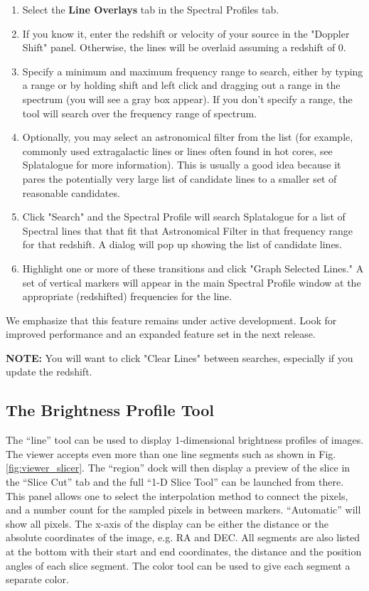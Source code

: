 \begin{enumerate}
\item Select the {\bf Line Overlays} tab in the Spectral Profiles tab.
\item If you know it, enter the redshift or velocity of your source in the "Doppler Shift" panel. Otherwise, the lines will be
overlaid assuming a redshift of 0.
\item Specify a minimum and maximum frequency range to search, either by typing a range or by holding 
shift and left click and dragging out a range in the spectrum (you will see a gray box appear). If you don't specify a range,
the tool will search over the frequency range of spectrum.
\item Optionally, you may select an astronomical filter from the list (for example, commonly used extragalactic lines or lines
often found in hot cores, see Splatalogue for more information). This is 
usually a good idea because it pares the potentially very large list of  candidate lines to a smaller set of reasonable candidates. 
\item Click "Search" and the Spectral Profile will search Splatalogue for a list of Spectral lines that that fit that Astronomical
Filter in that frequency range for that redshift. A dialog will pop up showing the list of candidate lines. 
\item Highlight one or more of these transitions and click "Graph Selected Lines." A set of vertical markers will 
appear in the main Spectral Profile window at the appropriate (redshifted) frequencies for the line.
\end{enumerate}

We emphasize that this feature remains under active development. Look for improved performance and an expanded feature set in the next release.

{\bf NOTE:} You will want to click "Clear Lines" between searches, especially if you update the redshift.


\subsection{The Brightness Profile Tool}
\label{section:display.image.bprofile}

The ``line'' tool can be used to display 1-dimensional brightness
profiles of images. The viewer accepts even more than one line
segments such as shown in Fig.\ref{fig:viewer_slicer}. The ``region''
dock will then display a preview of the slice in the ``Slice Cut'' tab
and the full ``1-D Slice Tool'' can be launched from there. This panel
allows one to select the interpolation method to connect the pixels,
and a number count for the sampled pixels in between
markers. ``Automatic'' will show all pixels. The x-axis of the display can
be either the distance or the absolute coordinates of the image,
e.g. RA and DEC. All segments are also listed at the bottom with their
start and end coordinates, the distance and the position angles of each
slice segment. The color tool can be used to give each segment a
separate color. 

